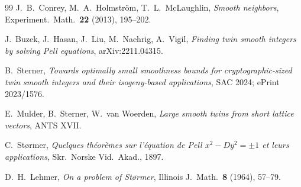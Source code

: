 \documentclass[11pt]{article}
\theoremstyle{remark}
\begin{document}
\begin{thebibliography}{99}
 J.~B.~Conrey, M.~A.~Holmstr\"om, T.~L.~McLaughlin,
\emph{Smooth neighbors}, Experiment.\ Math.\ \textbf{22} (2013), 195--202.

 J.~Buzek, J.~Hasan, J.~Liu, M.~Naehrig, A.~Vigil,
\emph{Finding twin smooth integers by solving Pell equations},
arXiv:2211.04315.

 B.~Sterner, \emph{Towards optimally small smoothness
bounds for cryptographic-sized twin smooth integers and their isogeny-based
applications}, SAC 2024; ePrint 2023/1576.

 E.~Mulder, B.~Sterner, W.~van Woerden, \emph{Large smooth twins
from short lattice vectors}, ANTS XVII.

 C.~St\o rmer, \emph{Quelques th\'eor\`emes sur l'\'equation
de Pell $x^2 - Dy^2 = \pm 1$ et leurs applications}, Skr.\ Norske Vid.\ Akad.,
1897.

 D.~H.~Lehmer, \emph{On a problem of St\o rmer}, Illinois
J.\ Math.\ \textbf{8} (1964), 57--79.

\end{thebibliography}
\end{document}
